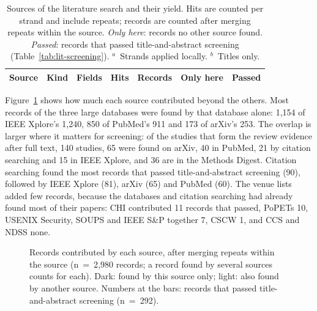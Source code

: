 \begin{table}[tbp]
\centering
\begin{singlespace}
\caption[Sources of the literature search and their yield]{Sources of the
literature search and their yield. Hits are counted per strand and include
repeats; records are counted after merging repeats within the source.
\emph{Only here}: records no other source found. \emph{Passed}: records that
passed title-and-abstract screening (Table~\ref{tab:lit-screening}).
$^a$~Strands applied locally. $^b$~Titles only.}
\label{tab:lit-sources}
\footnotesize
\setlength{\tabcolsep}{3.5pt}
\begin{tabularx}{\textwidth}{@{}>{\raggedright\arraybackslash}p{2.2cm}l>{\raggedright\arraybackslash}p{1.9cm}>{\raggedright\arraybackslash}Xrrr@{}}
\toprule
\textbf{Source} & \textbf{Kind} & \textbf{Fields} & \textbf{Hits} & \textbf{Records} & \textbf{Only here} & \textbf{Passed} \\
\midrule
\end{tabularx}
\end{singlespace}
\end{table}

Figure~\ref{fig:lit-sources} shows how much each source contributed beyond the
others. Most records of the three large databases were found by that database
alone:
1{,}154 of IEEE Xplore's 1{,}240, 850 of PubMed's 911 and 173 of arXiv's 253.
The overlap is larger where it matters for screening: of the studies that
form the review evidence after full text, 140 studies, 65 were found on arXiv,
40 in PubMed, 21 by citation searching and 15 in IEEE Xplore, and 36 are in the
Methods Digest. Citation searching found the most records that passed
title-and-abstract screening (90), followed by IEEE Xplore (81), arXiv (65) and
PubMed (60). The venue lists
added few records, because the databases and citation searching had already
found most of their papers: CHI contributed 11 records that passed, PoPETs 10,
USENIX Security, SOUPS and IEEE S\&P together 7, CSCW 1, and CCS and NDSS none.

\begin{figure}[tbp]
\centering

\caption[Records contributed by each source]{Records contributed by each
source, after merging repeats within the source (n~=~2{,}980 records; a record
found by several sources counts for each). Dark: found by this source only;
light: also found by another source. Numbers at the bars: records that passed
title-and-abstract screening (n~=~292).}
\label{fig:lit-sources}
\end{figure}

